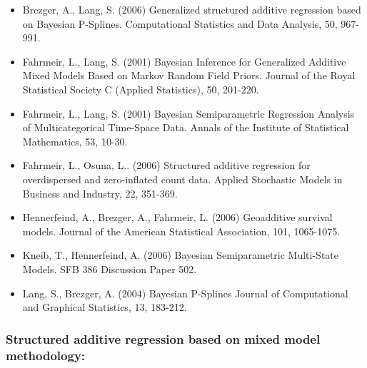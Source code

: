 \documentclass[11pt,a4paper,twoside]{bayesxarticle}
\begin{document}
\begin{itemize}
\item Brezger, A., Lang, S. (2006)
      Generalized structured additive regression based on Bayesian P-Splines.
      Computational Statistics and Data Analysis, 50,
      967-991.\vspace{-0.25cm}
\item Fahrmeir, L., Lang, S. (2001)
      Bayesian Inference for Generalized Additive Mixed Models Based on Markov Random Field Priors.
      Journal of the Royal Statistical Society C (Applied Statistics), 50, 201-220.\vspace{-0.25cm}
\item Fahrmeir, L., Lang, S. (2001)
      Bayesian Semiparametric Regression Analysis of Multicategorical Time-Space Data.
      Annals of the Institute of Statistical Mathematics, 53, 10-30.\vspace{-0.25cm}
\item Fahrmeir, L., Osuna, L.. (2006)
      Structured additive regression for overdispersed and zero-inflated count data.
      Applied Stochastic Models in Business and Industry, 22, 351-369.\vspace{-0.25cm}
\item Hennerfeind, A., Brezger, A., Fahrmeir, L. (2006)
      Geoadditive survival models.
      Journal of the American Statistical Association, 101, 1065-1075.\vspace{-0.25cm}
\item Kneib, T., Hennerfeind, A. (2006)
      Bayesian Semiparametric Multi-State Models.
      SFB 386 Discussion Paper 502.\vspace{-0.25cm}
\item Lang, S., Brezger, A. (2004)
      Bayesian P-Splines
      Journal of Computational and Graphical Statistics, 13, 183-212.
\end{itemize}

\subsubsection*{Structured additive regression based on mixed model
methodology:}
\end{document}
